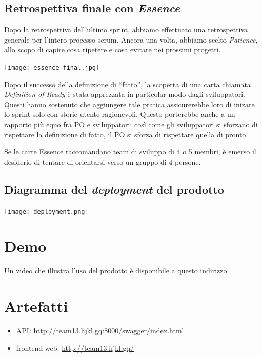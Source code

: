 \documentclass{article}
\begin{document}
\subsection{Retrospettiva finale con \emph{Essence}}

Dopo la retrospettiva dell'ultimo sprint, abbiamo effettuato una retrospettiva
generale per l'intero processo scrum. Ancora una volta, abbiamo scelto
\emph{Patience}, allo scopo di capire cosa ripetere e cosa evitare nei prossimi
progetti.

\texttt{[image: essence-final.jpg]}

Dopo il successo della definizione di ``fatto'', la scoperta di una carta chiamata
\emph{Definition of Ready} è stata apprezzata in particolar modo dagli
sviluppatori. Questi hanno sostenuto che aggiungere tale pratica assicurerebbe
loro di inizare lo sprint solo con storie utente ragionevoli. Questo porterebbe
anche a un rapporto più equo fra PO e sviluppatori: così come gli sviluppatori
si sforzano di rispettare la definizione di fatto, il PO si sforza di
rispettare quella di pronto.

Se le carte Essence raccomandano team di sviluppo di 4 o 5 membri, è emerso il
desiderio di tentare di orientarsi verso un gruppo di 4 persone.

\subsection{Diagramma del \emph{deployment} del prodotto}

\texttt{[image: deployment.png]}

\section{Demo}

Un video che illustra l'uso del prodotto è disponibile
\underline{\href{https://liveunibo-my.sharepoint.com/:v:/g/personal/federica_grisendi_studio_unibo_it/EaOojpKKw9ZIreuXeDcHFicBxvcOjSGP4zPOGXMwKPtEcA?e=QVfOKm}{a questo indirizzo}}.

\section{Artefatti}

\begin{itemize}
	\item API: \url{http://team13.hjkl.gq:8000/swagger/index.html}
	\item frontend web: \url{http://team13.hjkl.gq/}
\end{itemize}
\end{document}
